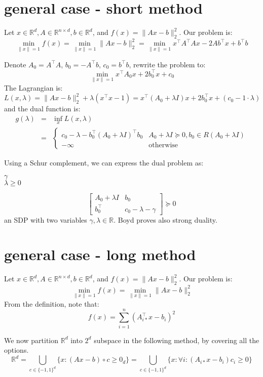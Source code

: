 \documentclass[12pt, a4paper]{article}
\newcommand{\norm}[1]{\lVert #1 \rVert}
\newcommand{\double}[1]{\mathbb{#1}}
\begin{document}
\newpage

\section{general case - short method}

Let $x\in\double{R}^d, A\in\double{R}^{n\times d}, b\in\double{R}^d$, and $f(x)=\norm{Ax-b}_2^2$. Our problem is:
\[\min_{\norm{x}=1} f(x)=\min_{\norm{x}=1} \norm{Ax-b}_2^2=\min_{\norm{x}=1} x^\top A^\top A x - 2Ab^\top x+b^\top b\]

Denote $A_0=A^\top A$, $b_0=-A^\top b$, $c_0=b^\top b$, rewrite the problem to:
\[\min_{\norm{x}=1} x^\top A_0 x + 2 b_0^\top x + c_0 \]
The Lagrangian is:
\[L(x,\lambda)=\norm{Ax-b}_2^2+\lambda(x^\top x-1)=x^\top(A_0+\lambda I)x+2b_0^\top x + (c_0-1\cdot \lambda)\]
and the dual function is:
\begin{eqnarray*}
    g(\lambda)&=&\inf_x L(x,\lambda) \\
    &=&\begin{cases}
        c_0 - \lambda - b_0^\top (A_0+\lambda I)^\top b_0 & A_0 + \lambda I \succeq 0, b_0 \in R(A_0+\lambda I) \\
        -\infty & \text{otherwise}
    \end{cases}
\end{eqnarray*}

Using a Schur complement, we can express the dual problem as:
\begin{center}
     $\gamma$\\
      $\lambda \geq 0$
\end{center}
\[\left[\begin{matrix}
    A_0 + \lambda I & b_0 \\ 
    b_0^\top & c_0 - \lambda - \gamma 
\end{matrix} \right]\succeq 0\]
an SDP with two variables $\gamma, \lambda \in \double{R}$.
Boyd proves also strong duality.
\newpage
\section{general case - long method}

Let $x\in\double{R}^d, A\in\double{R}^{n\times d}, b\in\double{R}^d$, and $f(x)=\norm{Ax-b}_2^2$. Our problem is:
\[\min_{\norm{x}=1} f(x)=\min_{\norm{x}=1} \norm{Ax-b}_2^2\]
From the definition, note that:
\[f(x)=\sum_{i=1}^n (A_{i*}^\top x-b_i)^2\]

We now partition $\double{R}^d$ into $2^d$ subspace in the following method, by covering all the options.
\[\double{R}^d=\bigcup_{c\in\{-1,1\}^d} \{x: (Ax-b)\circ c\geq 0_d\}= \bigcup_{c\in\{-1,1\}^d} \{x: \forall i: (A_{i*}x-b_i)c_i \geq 0\}\]
\end{document}
